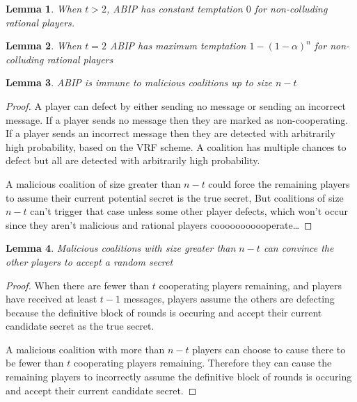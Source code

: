 \documentclass{dalcsthesis}
\newtheorem{lemma}{Lemma}
\begin{document}
\begin{lemma} When $t > 2$, ABIP has constant temptation $0$ for non-colluding rational players. \end{lemma}

\begin{lemma} When $t = 2$ ABIP has maximum temptation $1 - (1 - \alpha)^n$ for non-colluding rational players \end{lemma}

\begin{lemma} ABIP is immune to malicious coalitions up to size $n-t$ \end{lemma}
\begin{proof}
A player can defect by either sending no message or sending an incorrect message. If a player sends no message then they are marked as non-cooperating. If a player sends an incorrect message then they are detected with arbitrarily high probability, based on the VRF scheme. A coalition has multiple chances to defect but all are detected with arbitrarily high probability.

A malicious coalition of size greater than $n-t$ could force the remaining players to assume their current potential secret is the true secret, But coalitions of size $n-t$ can't trigger that case unless some other player defects, which won't occur since they aren't malicious and rational players cooooooooooperate\ldots
\end{proof}

\begin{lemma} Malicious coalitions with size greater than $n-t$ can convince the other players to accept a random secret \end{lemma}
\begin{proof}
When there are fewer than $t$ cooperating players remaining, and players have received at least $t-1$ messages, players assume the others are defecting because the definitive block of rounds is occuring and accept their current candidate secret as the true secret.

A malicious coalition with more than $n-t$ players can choose to cause there to be fewer than $t$ cooperating players remaining. Therefore they can cause the remaining players to incorrectly assume the definitive block of rounds is occuring and accept their current candidate secret.
\end{proof}
\end{document}
